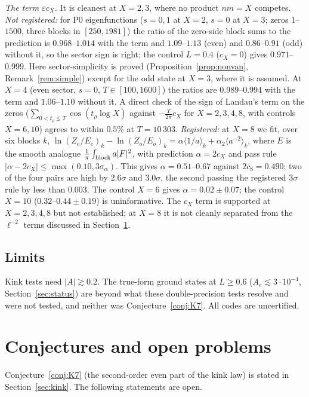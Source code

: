 \documentclass[11pt]{amsart}
\newcommand{\eps}{\varepsilon}
\newcommand{\e}[1]{\cdot 10^{#1}}
\theoremstyle{definition}
\theoremstyle{remark}
\numberwithin{equation}{section}
\begin{document}
\emph{The term $\eps c_X$.} It is cleanest at $X=2,3$, where no product $nm=X$ competes. \emph{Not registered:} for P0 eigenfunctions ($s=0,1$ at $X=2$, $s=0$ at $X=3$; zeros $1$--$1500$, three blocks in $[250,1981]$) the ratio of the zero-side block sums to the prediction is $0.968$--$1.014$ with the term and $1.09$--$1.13$ (even) and $0.86$--$0.91$ (odd) without it, so the sector sign is right; the control $L=0.4$ ($c_X=0$) gives $0.971$--$0.999$. Here sector-simplicity is proved (Proposition~\ref{prop:nonvan}, Remark~\ref{rem:simple}) except for the odd state at $X=3$, where it is assumed. At $X=4$ (even sector, $s=0$, $T\in[100,1600]$) the ratios are $0.989$--$0.994$ with the term and $1.06$--$1.10$ without it. A direct check of the sign of Landau's term on the zeros ($\sum_{0<t_\rho\le T}\cos(t_\rho\log X)$ against $-\frac T{2\pi}c_X$ for $X=2,3,4,8$, with controls $X=6,10$) agrees to within $0.5\%$ at $T=10\,303$. \emph{Registered:} at $X=8$ we fit, over six blocks $k$, $\ln(Z_e/E_e)_k-\ln(Z_o/E_o)_k=\alpha\langle1/a\rangle_k+\alpha_2\langle a^{-2}\rangle_k$, where $E$ is the smooth analogue $\frac1\pi\int_{\rm block}a|F|^2$, with prediction $\alpha=2c_X$ and pass rule $|\alpha-2c_X|\le\max(0.10,3\sigma_\alpha)$. This gives $\alpha=0.51$--$0.67$ against $2c_8=0.490$; two of the four pairs are high by $2.6\sigma$ and $3.0\sigma$, the second passing the registered $3\sigma$ rule by less than $0.003$. The control $X=6$ gives $\alpha=0.02\pm0.07$; the control $X=10$ ($0.32$--$0.44\pm0.19$) is uninformative. The $c_X$ term is supported at $X=2,3,4,8$ but not established; at $X=8$ it is not cleanly separated from the $\ell^{-2}$ terms discussed in Section~\ref{sec:conj}.

\subsection{Limits}
Kink tests need $|A|\gtrsim0.2$. The true-form ground states at $L\ge0.6$ ($A_e\lesssim3\e{-4}$, Section~\ref{sec:status}) are beyond what these double-precision tests resolve and were not tested, and neither was Conjecture~\ref{conj:K7}. All codes are uncertified.

\section{Conjectures and open problems}\label{sec:conj}

Conjecture~\ref{conj:K7} (the second-order even part of the kink law) is stated in Section~\ref{sec:kink}. The following statements are open.
\end{document}
